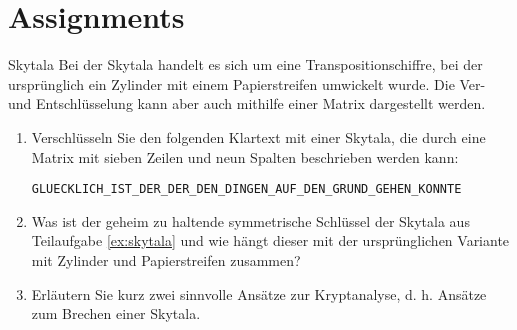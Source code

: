 \documentclass{article}
\author{Leopold Lemmermann}
\begin{document}
\createtitle

\section{Assignments}

\setcounter{subsection}{10}
\begin{exercise}{Skytala}
  Bei der Skytala handelt es sich um eine Transpositionschiffre, bei der ursprünglich ein Zylinder mit einem Papierstreifen umwickelt wurde. Die Ver- und Entschlüsselung kann aber auch mithilfe einer Matrix dargestellt werden.
  \begin{enumerate}
    \item\label{ex:skytala} Verschlüsseln Sie den folgenden Klartext mit einer Skytala, die durch eine Matrix mit sieben Zeilen und neun Spalten beschrieben werden kann:
      \begin{center}
        \texttt{GLUECKLICH\_IST\_DER\_DER\_DEN\_DINGEN\_AUF\_DEN\_GRUND\_GEHEN\_KONNTE}
      \end{center}
    \item Was ist der geheim zu haltende symmetrische Schlüssel der Skytala aus Teilaufgabe \ref{ex:skytala} und wie hängt dieser mit der ursprünglichen Variante mit Zylinder und Papierstreifen zusammen?
    \item Erläutern Sie kurz zwei sinnvolle Ansätze zur Kryptanalyse, d. h. Ansätze zum Brechen einer Skytala.
  \end{enumerate}


\end{exercise}
\end{document}
